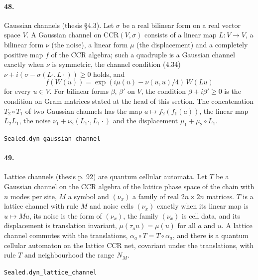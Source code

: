 \documentclass[11pt]{article}
\begin{document}
\paragraph{48.} Gaussian channels (thesis §4.3). Let $\sigma$ be a real bilinear form on a real vector space $V$. A Gaussian channel on $\mathrm{CCR}(V, \sigma)$ consists of a linear map $L : V \to V$, a bilinear form $\nu$ (the noise), a linear form $\mu$ (the displacement) and a completely positive map $f$ of the CCR algebra; such a quadruple is a Gaussian channel exactly when $\nu$ is symmetric, the channel condition (4.34) $\nu + i(\sigma - \sigma(L\cdot, L\cdot)) \ge 0$ holds, and \[f(W(u)) = \exp(i\mu(u) - \nu(u, u)/4)\, W(Lu)\] for every $u \in V$. For bilinear forms $\beta$, $\beta'$ on $V$, the condition $\beta + i\beta' \ge 0$ is the condition on Gram matrices stated at the head of this section. The concatenation $T_2 \circ T_1$ of two Gaussian channels has the map $a \mapsto f_2(f_1(a))$, the linear map $L_2 L_1$, the noise $\nu_1 + \nu_2(L_1\cdot, L_1\cdot)$ and the displacement $\mu_1 + \mu_2 \circ L_1$.\par{\footnotesize\texttt{Sealed.dyn\_gaussian\_channel}}

\paragraph{49.} Lattice channels (thesis p. 92) are quantum cellular automata. Let $T$ be a Gaussian channel on the CCR algebra of the lattice phase space of the chain with $n$ modes per site, $M$ a symbol and $(\nu_x)$ a family of real $2n \times 2n$ matrices. $T$ is a lattice channel with rule $M$ and noise cells $(\nu_x)$ exactly when its linear map is $u \mapsto Mu$, its noise is the form of $(\nu_x)$, the family $(\nu_x)$ is cell data, and its displacement is translation invariant, $\mu(\tau_a u) = \mu(u)$ for all $a$ and $u$. A lattice channel commutes with the translations, $\alpha_a \circ T = T \circ \alpha_a$, and there is a quantum cellular automaton on the lattice CCR net, covariant under the translations, with rule $T$ and neighbourhood the range $N_M$.\par{\footnotesize\texttt{Sealed.dyn\_lattice\_channel}}
\end{document}
